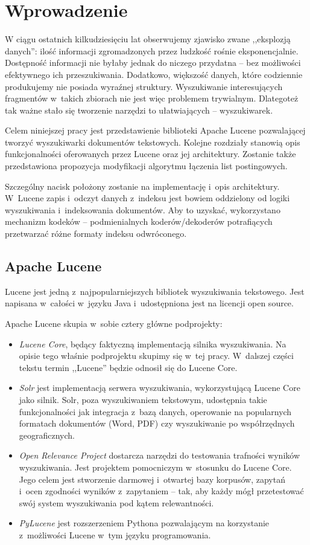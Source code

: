 \chapter{Wprowadzenie}

W ciągu ostatnich kilkudziesięciu lat obserwujemy zjawisko zwane ,,eksplozją danych'': ilość informacji zgromadzonych przez ludzkość rośnie eksponencjalnie. Dostępność informacji nie byłaby jednak do niczego przydatna -- bez możliwości efektywnego ich przeszukiwania. Dodatkowo, większość danych, które codziennie produkujemy nie posiada wyraźnej struktury.  Wyszukiwanie interesujących fragmentów w~takich zbiorach nie jest więc problemem trywialnym. Dlategoteż tak ważne stało się tworzenie narzędzi to ułatwiających -- wyszukiwarek. 

Celem niniejszej pracy jest przedstawienie biblioteki Apache Lucene pozwalającej tworzyć wyszukiwarki dokumentów tekstowych. Kolejne rozdziały stanowią opis funkcjonalności oferowanych przez Lucene oraz jej architektury. Zostanie także przedstawiona propozycja modyfikacji algorytmu łączenia list postingowych.

Szczególny nacisk położony zostanie na implementację i~opis architektury. W~Lucene zapis i~odczyt danych z~indeksu jest bowiem oddzielony od logiki wyszukiwania i~indeksowania dokumentów. Aby to uzyskać, wykorzystano mechanizm kodeków -- podmienialnych koderów/dekoderów potrafiących przetwarzać różne formaty indeksu odwróconego.

\section{Apache Lucene}

Lucene jest jedną z~najpopularniejszych bibliotek wyszukiwania tekstowego. Jest napisana w~całości w~języku Java i~udostępniona jest na licencji open source.

Apache Lucene skupia w~sobie cztery główne podprojekty: 
\begin{itemize}
 \item \emph{Lucene Core}, będący faktyczną implementacją silnika wyszukiwania. Na opisie tego właśnie podprojektu skupimy się w~tej pracy. W~dalszej części tekstu termin ,,Lucene'' będzie odnosił się do Lucene Core.
 \item \emph{Solr} jest implementacją serwera wyszukiwania, wykorzystującą Lucene Core jako silnik. Solr, poza wyszukiwaniem tekstowym, udostępnia takie funkcjonalności jak integracja z~bazą danych, operowanie na popularnych formatach dokumentów (Word, PDF) czy wyszukiwanie po współrzędnych geograficznych.
 \item \emph{Open Relevance Project} dostarcza narzędzi do testowania trafności wyników wyszukiwania. Jest projektem pomocniczym w~stosunku do Lucene Core. Jego celem jest stworzenie darmowej i~otwartej bazy korpusów, zapytań i~ocen zgodności wyników z~zapytaniem -- tak, aby każdy mógł przetestować swój system wyszukiwania pod kątem relewantności.
 \item \emph{PyLucene} jest rozszerzeniem Pythona pozwalającym na korzystanie z~możliwości Lucene w~tym języku programowania.
\end{itemize}

